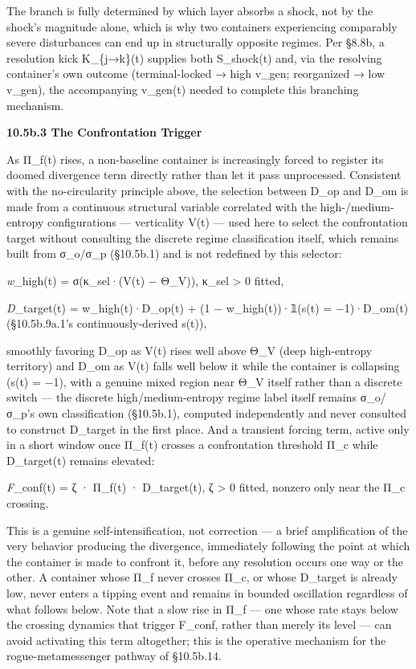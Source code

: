 \documentclass[
]{article}
\begin{document}
The branch is fully determined by which layer absorbs a shock, not by
the shock's magnitude alone, which is why two containers experiencing
comparably severe disturbances can end up in structurally opposite
regimes. Per §8.8b, a resolution kick K\_\{j→k\}(t) supplies both
S\_shock(t) and, via the resolving container's own outcome
(terminal-locked → high v\_gen; reorganized → low v\_gen), the
accompanying v\_gen(t) needed to complete this branching mechanism.

\textbf{10.5b.3 The Confrontation Trigger}

As Π\_f(t) rises, a non-baseline container is increasingly forced to
register its doomed divergence term directly rather than let it pass
unprocessed. Consistent with the no-circularity principle above, the
selection between D\_op and D\_om is made from a continuous structural
variable correlated with the high-/medium-entropy configurations ---
verticality V(t) --- used here to select the confrontation target
without consulting the discrete regime classification itself, which
remains built from σ\_o/σ\_p (§10.5b.1) and is not redefined by this
selector:

\emph{w}\_high(t) = σ(κ\_sel·(V(t) − Θ\_V)), κ\_sel \textgreater{} 0
fitted,

\emph{D}\_target(t) = w\_high(t)·D\_op(t) + (1 − w\_high(t))·𝟙(s(t) =
−1)·D\_om(t) (§10.5b.9a.1's continuously-derived s(t)),

smoothly favoring D\_op as V(t) rises well above Θ\_V (deep high-entropy
territory) and D\_om as V(t) falls well below it while the container is
collapsing (s(t) = −1), with a genuine mixed region near Θ\_V itself
rather than a discrete switch --- the discrete high/medium-entropy
regime label itself remains σ\_o/σ\_p's own classification (§10.5b.1),
computed independently and never consulted to construct D\_target in the
first place. And a transient forcing term, active only in a short window
once Π\_f(t) crosses a confrontation threshold Π\_c while D\_target(t)
remains elevated:

\emph{F}\_conf(t) = ζ · Π\_f(t) · D\_target(t), ζ \textgreater{} 0
fitted, nonzero only near the Π\_c crossing.

This is a genuine self-intensification, not correction --- a brief
amplification of the very behavior producing the divergence, immediately
following the point at which the container is made to confront it,
before any resolution occurs one way or the other. A container whose
Π\_f never crosses Π\_c, or whose D\_target is already low, never enters
a tipping event and remains in bounded oscillation regardless of what
follows below. Note that a slow rise in Π\_f --- one whose rate stays
below the crossing dynamics that trigger F\_conf, rather than merely its
level --- can avoid activating this term altogether; this is the
operative mechanism for the rogue-metamessenger pathway of §10.5b.14.
\end{document}
